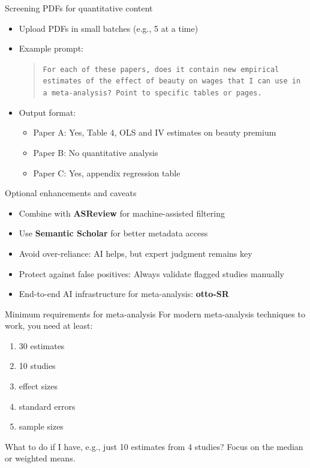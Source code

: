 \documentclass{beamer} %
\begin{document}
\begin{frame}{Screening PDFs for quantitative content}
\begin{itemize}
  \item Upload PDFs in small batches (e.g., 5 at a time)
  \item Example prompt:
	
  \begin{quote}
    \texttt{For each of these papers, does it contain new empirical estimates of the effect of beauty on wages that I can use in a meta-analysis? Point to specific tables or pages.}
  \end{quote}
	
  \item Output format:
	
  \begin{itemize}
    \item Paper A: Yes, Table 4, OLS and IV estimates on beauty premium
    \item Paper B: No quantitative analysis
    \item Paper C: Yes, appendix regression table
  \end{itemize}
	
\end{itemize}
\end{frame}

\begin{frame}{Optional enhancements and caveats}
\begin{itemize}
  \item Combine with \textbf{ASReview} for machine-assisted filtering
  \item Use \textbf{Semantic Scholar} for better metadata access
  \item Avoid over-reliance: AI helps, but expert judgment remains key
  \item Protect against false positives: Always validate flagged studies manually
	  \item End-to-end AI infrastructure for meta-analysis: \textbf{otto-SR}
\end{itemize}
\end{frame}

\begin{frame}{Minimum requirements for meta-analysis}
For modern meta-analysis techniques to work, you need at least:

\bigskip

\begin{enumerate}
	\item 30 estimates
	\item 10 studies
	\item effect sizes
	\item standard errors
	\item sample sizes
\end{enumerate}

\bigskip

What to do if I have, e.g., just 10 estimates from 4 studies? Focus on the median or weighted means.

\end{frame}
\end{document}
